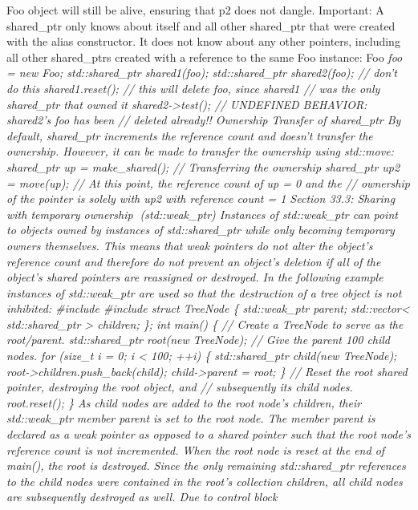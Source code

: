 Foo object will still be alive, ensuring that p2 does not dangle.
Important: A shared\_ptr only knows about itself and all other
shared\_ptr that were created with the alias constructor. It does not
know about any other pointers, including all other shared\_ptrs created
with a reference to the same Foo instance: Foo \emph{foo = new Foo;
std::shared\_ptr shared1(foo); std::shared\_ptr shared2(foo); // don't
do this shared1.reset(); // this will delete foo, since shared1 // was
the only shared\_ptr that owned it shared2-\textgreater test(); //
UNDEFINED BEHAVIOR: shared2's foo has been // deleted already!!
Ownership Transfer of shared\_ptr By default, shared\_ptr increments the
reference count and doesn't transfer the ownership. However, it can be
made to transfer the ownership using std::move: shared\_ptr up =
make\_shared(); // Transferring the ownership shared\_ptr up2 =
move(up); // At this point, the reference count of up = 0 and the //
ownership of the pointer is solely with up2 with reference count = 1
Section 33.3: Sharing with temporary ownership (std::weak\_ptr)
Instances of std::weak\_ptr can point to objects owned by instances of
std::shared\_ptr while only becoming temporary owners themselves. This
means that weak pointers do not alter the object's reference count and
therefore do not prevent an object's deletion if all of the object's
shared pointers are reassigned or destroyed. In the following example
instances of std::weak\_ptr are used so that the destruction of a tree
object is not inhibited: \#include \#include struct TreeNode \{
std::weak\_ptr parent; std::vector\textless{} std::shared\_ptr
\textgreater{} children; \}; int main() \{ // Create a TreeNode to serve
as the root/parent. std::shared\_ptr root(new TreeNode); // Give the
parent 100 child nodes. for (size\_t i = 0; i \textless{} 100; ++i) \{
std::shared\_ptr child(new TreeNode);
root-\textgreater children.push\_back(child); child-\textgreater parent
= root; \} // Reset the root shared pointer, destroying the root object,
and // subsequently its child nodes. root.reset(); \} As child nodes are
added to the root node's children, their std::weak\_ptr member parent is
set to the root node. The member parent is declared as a weak pointer as
opposed to a shared pointer such that the root node's reference count is
not incremented. When the root node is reset at the end of main(), the
root is destroyed. Since the only remaining std::shared\_ptr references
to the child nodes were contained in the root's collection children, all
child nodes are subsequently destroyed as well. Due to control block
}
